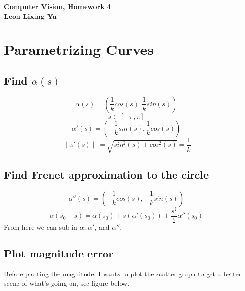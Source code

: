 \documentclass[twoside]{article}
\theoremstyle{definition}
\theoremstyle{definition}
\theoremstyle{remark}
\begin{document}
\textbf{Computer Vision, Homework 4}\\
\textbf{Leon Lixing Yu}\\


\section{Parametrizing Curves}

\subsection{Find $\alpha(s)$}
\[\alpha (s) = (\frac{1}{k} cos(s), \frac{1}{k} sin(s))\]
\[ s \in [-\pi, \pi]\]
\[\alpha'(s) = (-\frac{1}{k} sin(s), \frac{1}{k} cos(s))\]
\[\| \alpha'(s)\| = \sqrt{sin^2(s)+cos^2(s)} = \frac{1}{k}\]

\subsection{Find Frenet approximation to the circle}
\[\alpha''(s) = (-\frac{1}{k} cos(s), -\frac{1}{k} sin(s))\]
\[\alpha (s_0 + s) = \alpha (s_0) + s ( \alpha' (s_0)) + \frac{s^2}{2} \alpha''(s_0)\]
From here we can sub in $\alpha$, $\alpha'$, and $\alpha''$.\\

\subsection{Plot magnitude error}
Before plotting the magnitude, I wants to plot the scatter graph to get a better scene of what's going on, see figure below. 
\end{document}

